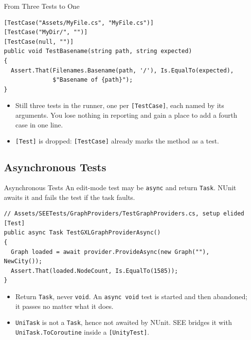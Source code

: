 \begin{solutionframe}{From Three Tests to One}
  \begin{lstlisting}[basicstyle=\scriptsize\ttfamily]
[TestCase("Assets/MyFile.cs", "MyFile.cs")]
[TestCase("MyDir/", "")]
[TestCase(null, "")]
public void TestBasename(string path, string expected)
{
  Assert.That(Filenames.Basename(path, '/'), Is.EqualTo(expected),
              $"Basename of {path}");
}
  \end{lstlisting}
  \begin{itemize}
    \item Still three tests in the runner, one per \texttt{[TestCase]}, each
      named by its arguments. You lose nothing in reporting and gain a place to
      add a fourth case in one line.
    \item \texttt{[Test]} is dropped: \texttt{[TestCase]} already marks the
      method as a test.
  \end{itemize}
  \vspace{2ex}

\end{solutionframe}

\subsection{Asynchronous Tests}

\begin{frame}[fragile]{Asynchronous Tests}
  An edit-mode test may be \texttt{async} and return \texttt{Task}. NUnit awaits
  it and fails the test if the task faults.
  \vspace{0.5ex}

  \begin{lstlisting}[basicstyle=\scriptsize\ttfamily]
// Assets/SEETests/GraphProviders/TestGraphProviders.cs, setup elided
[Test]
public async Task TestGXLGraphProviderAsync()
{
  Graph loaded = await provider.ProvideAsync(new Graph(""), NewCity());
  Assert.That(loaded.NodeCount, Is.EqualTo(1585));
}
  \end{lstlisting}
  \vspace{0.5ex}

  \begin{itemize}
    \item Return \texttt{Task}, never \texttt{void}. An \texttt{async void}
      test is started and then abandoned; it passes no matter what it does.
    \item \texttt{UniTask} is not a \texttt{Task}, hence not awaited by NUnit.
      SEE bridges it with \texttt{UniTask.ToCoroutine} inside a
      \texttt{[UnityTest]}.
  \end{itemize}
  \vspace{1ex}

\end{frame}

